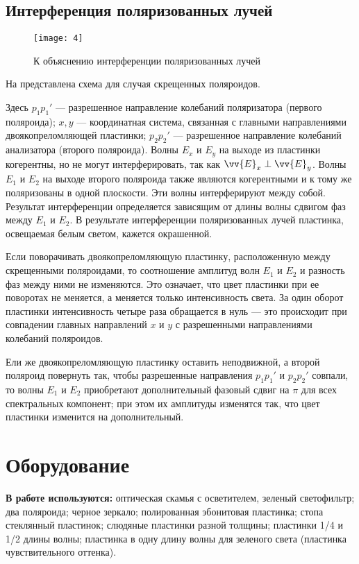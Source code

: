 \documentclass[a4paper, 12pt]{article}
\begin{document}
\subsection*{Интерференция поляризованных лучей}
\begin{wrapfigure}{r}{0.3\linewidth}
    \texttt{[image: 4]}
    \caption{К объяснению интерференции поляризованных лучей}
    \label{fig:4}
\end{wrapfigure}

На  представлена схема для случая скрещенных поляроидов.

Здесь $p_1p_1'$ --- разрешенное направление колебаний поляризатора
(первого поляроида); $x, y$ --- координатная система, связанная с
главными направлениями двоякопреломляющей пластинки; $p_2p_2'$ ---
разрешенное направление колебаний анализатора (второго поляроида).
Волны $E_x$ и $E_y$ на выходе из пластинки когерентны, но не могут
интерферировать, так как $\vv{E}_x \perp \vv{E}_y$. Волны $E_1$ и
$E_2$ на выходе второго поляроида также являются когерентными и к тому
же поляризованы в одной плоскости. Эти волны интерферируют между
собой. Результат интерференции определяется зависящим от длины волны
сдвигом фаз между $E_1$ и $E_2$. В результате интерференции
поляризованных лучей пластинка, освещаемая белым светом, кажется
окрашенной.

Если поворачивать двоякопреломляющую пластинку, расположенную между
скрещенными поляроидами, то соотношение амплитуд волн $E_1$ и $E_2$ и
разность фаз между ними не изменяются. Это означает, что цвет
пластинки при ее поворотах не меняется, а меняется только
интенсивность света. За один оборот пластинки интенсивность четыре раза
обращается в нуль --- это происходит при совпадении главных направлений
$x$ и $y$ с разрешенными направлениями колебаний поляроидов.

Ели же двоякопреломляющую пластинку оставить неподвижной, а второй
поляроид повернуть так, чтобы разрешенные направления $p_1p_1'$ и
$p_2p_2'$ совпали, то волны $E_1$ и $E_2$ приобретают дополнительный
фазовый сдвиг на $\pi$ для всех спектральных компонент; при этом их
амплитуды изменятся так, что цвет пластинки изменится на
дополнительный.

\section{Оборудование}
\textbf{В работе используются:} оптическая скамья с осветителем,
зеленый светофильтр; два поляроида; черное зеркало; полированная
эбонитовая пластинка; стопа стеклянный пластинок; слюдяные пластинки
разной толщины; пластинки 1/4 и 1/2 длины волны; пластинка в одну
длину волны для зеленого света (пластинка чувствительного оттенка).
\end{document}
